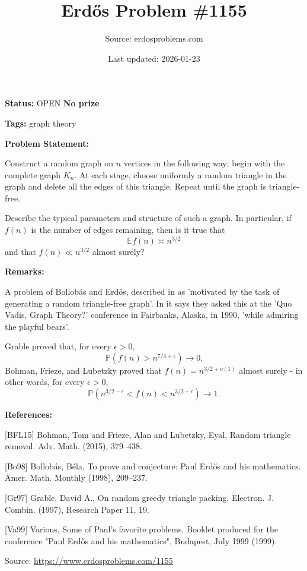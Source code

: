 \documentclass{article}
\title{Erd\H{o}s Problem \#1155}
\date{Last updated: 2026-01-23}
\author{Source: erdosproblems.com}
\begin{document}
\maketitle

\noindent\textbf{Status:} OPEN \quad \textbf{No prize}

\noindent\textbf{Tags:} graph theory

\medskip
\noindent\textbf{Problem Statement:}

Construct a random graph on $n$ vertices in the following way: begin with the complete graph $K_n$. At each stage, choose uniformly a random triangle in the graph and delete all the edges of this triangle. Repeat until the graph is triangle-free.

Describe the typical parameters and structure of such a graph. In particular, if $f(n)$ is the number of edges remaining, then is it true that\[\mathbb{E}f(n)\asymp n^{3/2}\]and that $f(n) \ll n^{3/2}$ almost surely?

\bigskip
\noindent\textbf{Remarks:}

A problem of Bollob\'{a}s and Erd\H{o}s, described in \cite{Va99} as 'motivated by the task of generating a random triangle-free graph'. In \cite{Bo98} it says they asked this at the 'Quo Vadis, Graph Theory?' conference in Fairbanks, Alaska, in 1990, 'while admiring the playful bears'.

Grable \cite{Gr97} proved that, for every $\epsilon>0$,\[\mathbb{P}(f(n)>n^{7/4+\epsilon})\to 0.\]Bohman, Frieze, and Lubetzky \cite{BFL15} proved that $f(n)=n^{3/2+o(1)}$ almost surely - in other words, for every $\epsilon>0$,\[\mathbb{P}(n^{3/2-\epsilon}<f(n)<n^{3/2+\epsilon})\to 1.\]

\bigskip
\noindent\textbf{References:}

[BFL15] Bohman, Tom and Frieze, Alan and Lubetzky, Eyal, Random triangle removal. Adv. Math. (2015), 379--438.
 
 [Bo98] Bollob\'{a}s, B\'ela, To prove and conjecture: {P}aul {E}rd\H os and his
mathematics. Amer. Math. Monthly (1998), 209--237.
 
 [Gr97] Grable, David A., On random greedy triangle packing. Electron. J. Combin. (1997), Research Paper 11, 19.
 
 [Va99] Various, Some of Paul's favorite problems. Booklet produced for the conference "Paul Erd\H{o}s and his mathematics", Budapest, July 1999 (1999).

\bigskip
\noindent\small{Source: \url{https://www.erdosproblems.com/1155}}
\end{document}
